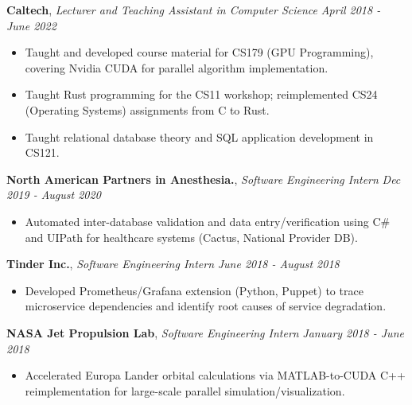 \documentclass[8pt]{article}
\newenvironment{changemargin}[2]{%
  \begin{list}{}{%
    \setlength{\topsep}{0pt}%
    \setlength{\leftmargin}{#1}%
    \setlength{\rightmargin}{#2}%
    \setlength{\listparindent}{\parindent}%
    \setlength{\itemindent}{\parindent}%
    \setlength{\parsep}{0pt}%
    \setlength{\itemsep}{-2pt}%
  }%
  \item[]}{\end{list}
}
\newenvironment{body} {
	\vspace*{-10pt}
	\begin{changemargin}{-0.25in}{-0.5in}
  }	
	{\end{changemargin}
}
\begin{document}
\begin{body}
	\textbf{Caltech}, \emph{Lecturer and Teaching Assistant in Computer Science} \hfill \emph{April 2018 - June 2022}\\
	\vspace*{-6pt}
	\begin{itemize} \itemsep -2pt
		\item Taught and developed course material for CS179 (GPU Programming), covering Nvidia CUDA for parallel algorithm implementation.
		\item Taught Rust programming for the CS11 workshop; reimplemented CS24 (Operating Systems) assignments from C to Rust.
		\item Taught relational database theory and SQL application development in CS121.
	\end{itemize}
	\vspace*{-6pt}

	\textbf{North American Partners in Anesthesia.}, \emph{Software Engineering Intern} \hfill
	\emph{Dec 2019 - August 2020}\\
	\vspace*{-5pt}
	\begin{itemize} \itemsep -2pt
		\item Automated inter-database validation and data entry/verification using C\# and UIPath for healthcare systems (Cactus, National Provider DB).
	\end{itemize}
	\vspace*{-6pt}

	\textbf{Tinder Inc.}, \emph{Software Engineering Intern} \hfill \emph{June 2018 - August 2018}\\
	\vspace*{-5pt}
	\begin{itemize} \itemsep -2pt
		\item Developed Prometheus/Grafana extension (Python, Puppet) to trace microservice dependencies and identify root causes of service degradation.
	\end{itemize}
	\vspace*{-6pt}

	\textbf{NASA Jet Propulsion Lab}, \emph{Software Engineering Intern} \hfill \emph{January 2018 - June 2018}\\
	\vspace*{-5pt}
	\begin{itemize} \itemsep -2pt
		\item Accelerated Europa Lander orbital calculations via MATLAB-to-CUDA C++ reimplementation for large-scale parallel simulation/visualization.
	\end{itemize}
	\vspace*{-6pt}


\end{body}
\end{document}
